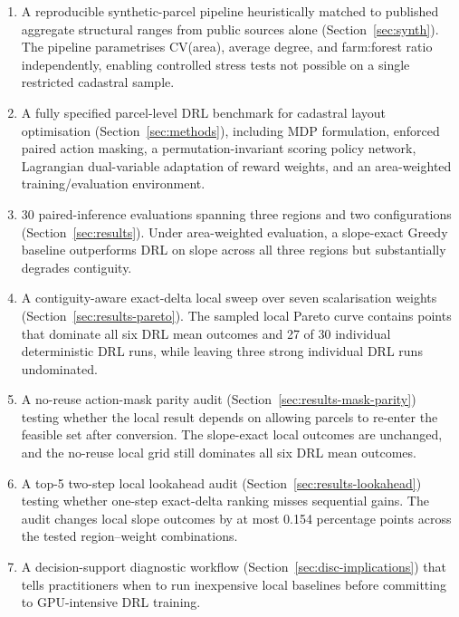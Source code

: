 \documentclass[]{interact}
\theoremstyle{plain}
\begin{document}
\begin{enumerate}
\item A reproducible synthetic-parcel pipeline heuristically matched to published aggregate structural ranges from public sources alone (Section~\ref{sec:synth}). The pipeline parametrises CV(area), average degree, and farm:forest ratio independently, enabling controlled stress tests not possible on a single restricted cadastral sample.

\item A fully specified parcel-level DRL benchmark for cadastral layout optimisation (Section~\ref{sec:methods}), including MDP formulation, enforced paired action masking, a permutation-invariant scoring policy network, Lagrangian dual-variable adaptation of reward weights, and an area-weighted training/evaluation environment.

\item 30 paired-inference evaluations spanning three regions and two configurations (Section~\ref{sec:results}). Under area-weighted evaluation, a slope-exact Greedy baseline outperforms DRL on slope across all three regions but substantially degrades contiguity.

\item A contiguity-aware exact-delta local sweep over seven scalarisation weights (Section~\ref{sec:results-pareto}). The sampled local Pareto curve contains points that dominate all six DRL mean outcomes and 27 of 30 individual deterministic DRL runs, while leaving three strong individual DRL runs undominated.

\item A no-reuse action-mask parity audit (Section~\ref{sec:results-mask-parity}) testing whether the local result depends on allowing parcels to re-enter the feasible set after conversion. The slope-exact local outcomes are unchanged, and the no-reuse local grid still dominates all six DRL mean outcomes.

\item A top-5 two-step local lookahead audit (Section~\ref{sec:results-lookahead}) testing whether one-step exact-delta ranking misses sequential gains. The audit changes local slope outcomes by at most 0.154 percentage points across the tested region--weight combinations.

\item A decision-support diagnostic workflow (Section~\ref{sec:disc-implications}) that tells practitioners when to run inexpensive local baselines before committing to GPU-intensive DRL training.


\end{enumerate}
\end{document}
